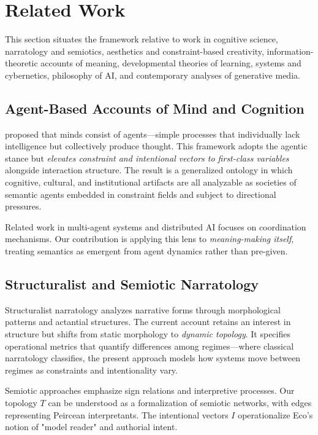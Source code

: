 \documentclass[12pt]{article}
\begin{document}
\section{Related Work}
\label{sec:related}

This section situates the framework relative to work in cognitive science, narratology and semiotics, aesthetics and constraint-based creativity, information-theoretic accounts of meaning, developmental theories of learning, systems and cybernetics, philosophy of AI, and contemporary analyses of generative media.

\subsection{Agent-Based Accounts of Mind and Cognition}

\citet{minsky1988society} proposed that minds consist of agents—simple processes that individually lack intelligence but collectively produce thought. This framework adopts the agentic stance but \textit{elevates constraint and intentional vectors to first-class variables} alongside interaction structure. The result is a generalized ontology in which cognitive, cultural, and institutional artifacts are all analyzable as societies of semantic agents embedded in constraint fields and subject to directional pressures.

Related work in multi-agent systems \citep{shoham2008multiagent} and distributed AI \citep{stone2000multiagent} focuses on coordination mechanisms. Our contribution is applying this lens to \textit{meaning-making itself}, treating semantics as emergent from agent dynamics rather than pre-given.

\subsection{Structuralist and Semiotic Narratology}

Structuralist narratology \citep{propp1968morphology, barthes1977structural, greimas1983structural} analyzes narrative forms through morphological patterns and actantial structures. The current account retains an interest in structure but shifts from static morphology to \textit{dynamic topology}. It specifies operational metrics that quantify differences among regimes—where classical narratology classifies, the present approach models how systems move between regimes as constraints and intentionality vary.

Semiotic approaches \citep{eco1976theory, peirce1931collected} emphasize sign relations and interpretive processes. Our topology $T$ can be understood as a formalization of semiotic networks, with edges representing Peircean interpretants. The intentional vectors $I$ operationalize Eco's notion of "model reader" and authorial intent.
\end{document}
